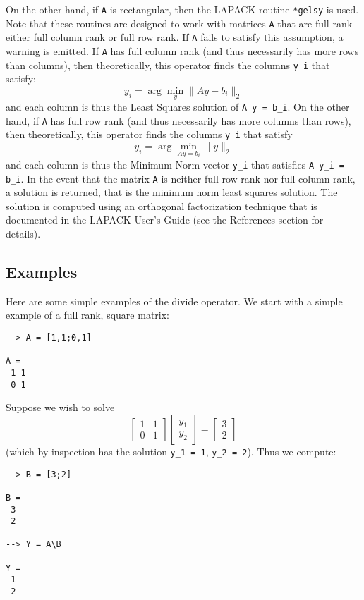 On the other hand, if \verb|A| is rectangular, then the LAPACK routine \verb|*gelsy| is used.  Note that these routines are designed to work with matrices \verb|A| that are full rank - either full column rank or full row rank.  If \verb|A| fails to satisfy this assumption, a warning is emitted.  If \verb|A| has full column rank (and thus necessarily has more rows than columns), then theoretically, this operator finds the columns \verb|y_i| that satisfy:
\[
  y_i = \arg \min_y \| A y - b_i \|_2
\]
and each column is thus the Least Squares solution of \verb|A y = b_i|.  On the other hand, if \verb|A| has full row rank (and thus necessarily has more columns than rows), then theoretically, this operator finds the columns \verb|y_i| that satisfy
\[
  y_i = \arg \min_{A y = b_i} \| y \|_2
\]
and each column is thus the Minimum Norm vector \verb|y_i| that satisfies \verb|A y_i = b_i|.  
In the event that the matrix \verb|A| is neither full row rank nor full column rank, a solution is returned, that is the minimum norm least squares solution.  The solution is computed using an orthogonal factorization technique that is documented in the LAPACK User's Guide (see the References section for details).
\subsection{Examples}

Here are some simple examples of the divide operator.  We start with a simple example of a full rank, square matrix:
\begin{verbatim}
--> A = [1,1;0,1]

A = 
 1 1 
 0 1 
\end{verbatim}
Suppose we wish to solve
\[
  \begin{bmatrix} 1 & 1 \\ 0 & 1 \end{bmatrix}
  \begin{bmatrix} y_1 \\ y_2 \end{bmatrix}
 = 
  \begin{bmatrix} 3 \\ 2 \end{bmatrix}
\]
(which by inspection has the solution \verb|y_1 = 1|, \verb|y_2 = 2|).  Thus we compute:
\begin{verbatim}
--> B = [3;2]

B = 
 3 
 2 

--> Y = A\B

Y = 
 1 
 2 
\end{verbatim}

